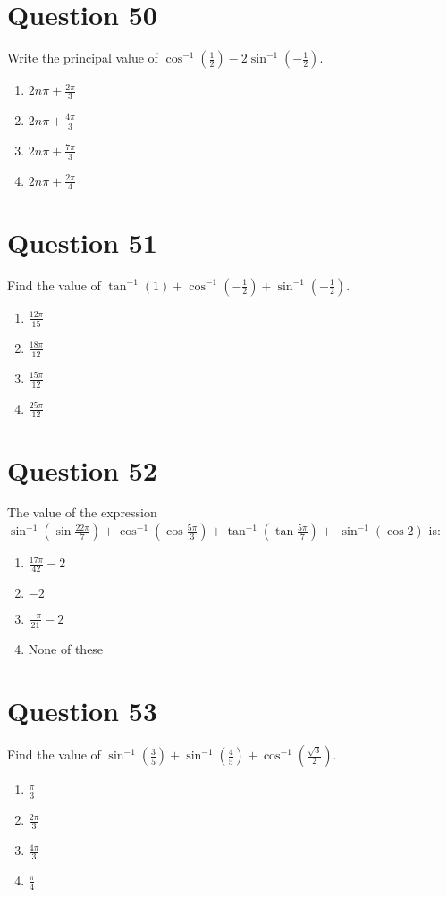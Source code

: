 \documentclass{article}
\begin{document}
\section*{Question 50}
Write the principal value of \(\cos ^{-1}\left(\frac{1}{2}\right)-2 \sin ^{-1}\left(-\frac{1}{2}\right)\).
\begin{enumerate}[label=(\alph*)]
\item \(2 n \pi+\frac{2 \pi}{3}\)
\item \(2 n \pi+\frac{4 \pi}{3}\)
\item \(2 n \pi+\frac{7 \pi}{3}\)
\item \(2 n \pi+\frac{2 \pi}{4}\)
\end{enumerate}
\newpage
\section*{Question 51}
Find the value of \(\tan ^{-1}(1)+\cos ^{-1}\left(-\frac{1}{2}\right)+\sin ^{-1}\left(-\frac{1}{2}\right)\).
\begin{enumerate}[label=(\alph*)]
\item \(\frac{12 \pi}{15}\)
\item \(\frac{18 \pi}{12}\)
\item \(\frac{15 \pi}{12}\)
\item \(\frac{25 \pi}{12}\)
\end{enumerate}
\newpage
\section*{Question 52}
The value of the expression \(\sin ^{-1}\left(\sin \frac{22 \pi}{7}\right)+\cos ^{-1}\left(\cos \frac{5 \pi}{3}\right)+\tan ^{-1}\left(\tan \frac{5 \pi}{7}\right)+\) \(\sin ^{-1}(\cos 2)\) is:
\begin{enumerate}[label=(\alph*)]
\item \(\frac{17 \pi}{42}-2\)
\item \(-2\)
\item \(\frac{-\pi}{21}-2\)
\item None of these
\end{enumerate}
\newpage
\section*{Question 53}
Find the value of \(\sin ^{-1}\left(\frac{3}{5}\right)+\sin ^{-1}\left(\frac{4}{5}\right)+\cos ^{-1}\left(\frac{\sqrt{3}}{2}\right)\).\newline
\begin{enumerate}[label=(\alph*)]
\item \(\frac{\pi}{3}\)
\item \(\frac{2\pi}{3}\)
\item \(\frac{4\pi}{3}\)
\item \(\frac{\pi}{4}\)
\end{enumerate}
\newpage
\end{document}
